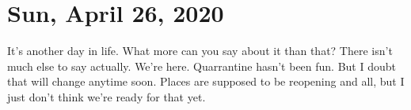 \section{Sun, April 26, 2020}
It's another day in life. What more can you say about it than that? There isn't 
much else to say actually. We're here. Quarrantine hasn't been fun. But I doubt 
that will change anytime soon. Places are supposed to be reopening and all, but 
I just don't think we're ready for that yet.
